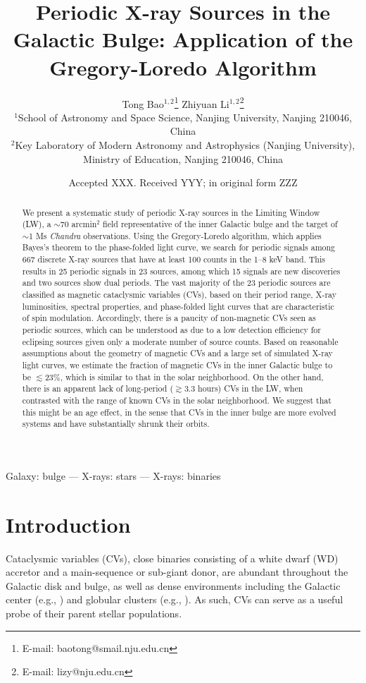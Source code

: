 \documentclass[fleqn,usenatbib]{mnras}
\title[Periodic X-ray Sources in the Galactic Bulge]{Periodic X-ray Sources in the Galactic Bulge: Application of the Gregory-Loredo Algorithm}
\author[Bao \& Li]{
Tong Bao$^{1,2}$\thanks{E-mail: baotong@smail.nju.edu.cn}
Zhiyuan Li$^{1,2}$\thanks{E-mail: lizy@nju.edu.cn}
\\
$^{1}$School of Astronomy and Space Science, Nanjing University, Nanjing 210046, China\\
$^{2}$Key Laboratory of Modern Astronomy and Astrophysics (Nanjing University), Ministry of Education, Nanjing 210046, China
}
\date{Accepted XXX. Received YYY; in original form ZZZ}
\begin{document}
\maketitle
\begin{abstract}
We present a systematic study of periodic X-ray sources in the Limiting Window (LW), a $\sim$70 arcmin$^2$ field representative of the inner Galactic bulge and the target of $\sim$1 Ms {\it Chandra} observations.  
Using the Gregory-Loredo algorithm, which applies Bayes's theorem to the phase-folded light curve, we search for periodic signals among 667 discrete X-ray sources that have at least 100 counts in the 1--8 keV band. 
This results in 25 periodic signals in 23 sources, among which 15 signals are new discoveries and two sources show dual periods. 
The vast majority of the 23 periodic sources are classified as magnetic cataclysmic variables (CVs), based on their period range, X-ray luminosities, spectral properties, and phase-folded light curves that are characteristic of spin modulation.
Accordingly, there is a paucity of non-magnetic CVs seen as periodic sources, which can be understood as due to a low detection efficiency for eclipsing sources given only a moderate number of source counts. 
Based on reasonable assumptions about the geometry of magnetic CVs and a large set of simulated X-ray light curves, we estimate the fraction of magnetic CVs in the inner Galactic bulge to be $\lesssim$23\%, which is similar to that in the solar neighborhood.
On the other hand, there is an apparent lack of long-period ($\gtrsim$3.3 hours) CVs in the LW, when contrasted with the range of known CVs in the solar neighborhood.
We suggest that this might be an age effect, in the sense that CVs in the inner bulge are more evolved systems and have substantially shrunk their orbits. 
\end{abstract}

\begin{keywords}
Galaxy: bulge --- X-rays: stars --- X-rays: binaries
\end{keywords}

\section{Introduction} \label{sec:intro}
Cataclysmic variables (CVs), close binaries consisting of a white dwarf (WD) accretor and a main-sequence or sub-giant donor,
are abundant throughout the Galactic disk and bulge, as well as dense environments including the Galactic center (e.g., \citealp{2003ApJ...599..465M,2009ApJS..181..110M,2018ApJS..235...26Z}) and globular clusters (e.g., \citealp{2006ApJ...646L.143P,2018ApJ...858...33C}). 
As such, CVs can serve as a useful probe of their parent stellar populations.
\end{document}
